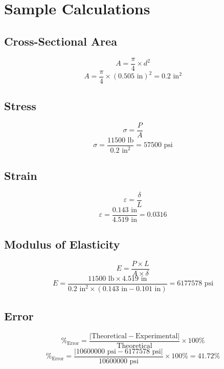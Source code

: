 \documentclass{article}
\begin{document}
    \section{Sample Calculations}
    \subsection{Cross-Sectional Area}
    \[A=\frac{\pi}{4}\times d^2\]
    \[A=\frac{\pi}{4}\times (0.505\text{ in})^2=\boxed{0.2\text{ in}^2}\]
    \subsection{Stress}
    \[\sigma=\frac{P}{A}\]
    \[\sigma=\frac{11500\text{ lb}}{0.2\text{ in}^2}=\boxed{57500\text{ psi}}\]
    \subsection{Strain}
    \[\varepsilon=\frac{\delta}{L}\]
    \[\varepsilon=\frac{0.143\text{ in}}{4.519\text{ in}}=\boxed{0.0316}\]
    \subsection{Modulus of Elasticity}
    \[E=\frac{P\times L}{A\times \delta}\]
    \[E=\frac{11500\text{ lb}\times 4.519\text{ in}}{0.2\text{ in}^2\times (0.143\text{ in}-0.101\text{ in})}=\boxed{6177578\text{ psi}}\]
    \subsection{Error}
    \[\%_\text{Error}=\frac{|\text{Theoretical}-\text{Experimental}|}{\text{Theoretical}}\times 100\%\]
    \[\%_\text{Error}=\frac{|\text{10600000 psi}-\text{6177578 psi}|}{\text{10600000 psi}}\times 100\%=\boxed{41.72\%}\]
    \newpage
\end{document}
